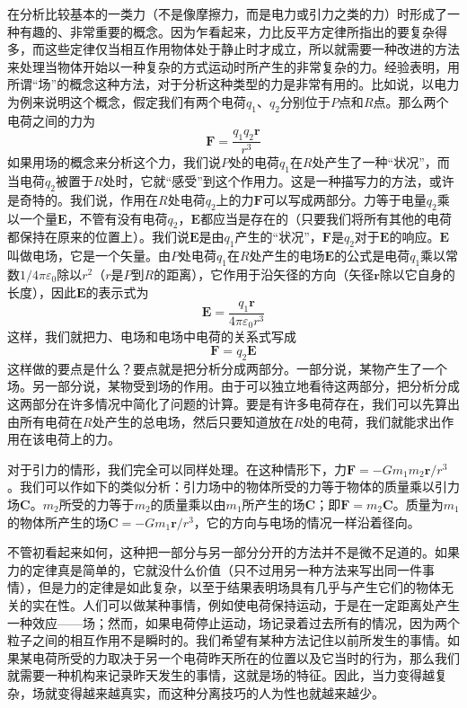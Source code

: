 在分析比较基本的一类力（不是像摩擦力，而是电力或引力之类的力）时形成了一种有趣的、非常重要的概念。因为乍看起来，力比反平方定律所指出的要复杂得多，而这些定律仅当相互作用物体处于静止时才成立，所以就需要一种改进的方法来处理当物体开始以一种复杂的方式运动时所产生的非常复杂的力。经验表明，用所谓“场”的概念这种方法，对于分析这种类型的力是非常有用的。比如说，以电力为例来说明这个概念，假定我们有两个电荷$q_1$、$q_2$分别位于$P$点和$R$点。那么两个电荷之间的力为
\begin{equation}
    \label{Eq:I:12:3}
    \boldsymbol{F}=\frac{q_1q_2 \boldsymbol{r}}{r^3}
\end{equation}
如果用场的概念来分析这个力，我们说$P$处的电荷$q_1$在$R$处产生了一种“状况”，而当电荷$q_2$被置于$R$处时，它就“感受”到这个作用力。这是一种描写力的方法，或许是奇特的。我们说，作用在$R$处电荷$q_2$上的力$\boldsymbol{F}$可以写成两部分。力等于电量$q_2$乘以一个量$\boldsymbol{E}$，不管有没有电荷$q_2$，$\boldsymbol{E}$都应当是存在的（只要我们将所有其他的电荷都保持在原来的位置上）。我们说$\boldsymbol{E}$是由$q_1$产生的“状况”，$\boldsymbol{F}$是$q_2$对于$\boldsymbol{E}$的响应。$\boldsymbol{E}$叫做电场，它是一个矢量。由$P$处电荷$q_1$在$R$处产生的电场$\boldsymbol{E}$的公式是电荷$q_1$乘以常数$1/4 \pi \varepsilon_0$除以$r^2$（$r$是$P$到$R$的距离），它作用于沿矢径的方向（矢径$\boldsymbol{r}$除以它自身的长度），因此$\boldsymbol{E}$的表示式为
\begin{equation}
    \label{Eq:I:12:4}
    \boldsymbol{E}=\frac{q_1 \boldsymbol{r}}{4 \pi \varepsilon_0 r^3}
\end{equation}
这样，我们就把力、电场和电场中电荷的关系式写成
\begin{equation}
    \label{Eq:I:12:5}
    \boldsymbol{F}=q_2 \boldsymbol{E}
\end{equation}
这样做的要点是什么？要点就是把分析分成两部分。一部分说，某物产生了一个场。另一部分说，某物受到场的作用。由于可以独立地看待这两部分，把分析分成这两部分在许多情况中简化了问题的计算。要是有许多电荷存在，我们可以先算出由所有电荷在$R$处产生的总电场，然后只要知道放在$R$处的电荷，我们就能求出作用在该电荷上的力。

对于引力的情形，我们完全可以同样处理。在这种情形下，力$\boldsymbol{F}=-Gm_1m_2\boldsymbol{r}/r^3$。我们可以作如下的类似分析：引力场中的物体所受的力等于物体的质量乘以引力场$\boldsymbol{C}$。$m_2$所受的力等于$m_2$的质量乘以由$m_1$所产生的场$\boldsymbol{C}$；即$\boldsymbol{F}=m_2\boldsymbol{C}$。质量为$m_1$的物体所产生的场$\boldsymbol{C}=-Gm_1 \boldsymbol{r}/r^3$，它的方向与电场的情况一样沿着径向。

不管初看起来如何，这种把一部分与另一部分分开的方法并不是微不足道的。如果力的定律真是简单的，它就没什么价值（只不过用另一种方法来写出同一件事情），但是力的定律是如此复杂，以至于结果表明场具有几乎与产生它们的物体无关的实在性。人们可以做某种事情，例如使电荷保持运动，于是在一定距离处产生一种效应——场；然而，如果电荷停止运动，场记录着过去所有的情况，因为两个粒子之间的相互作用不是瞬时的。我们希望有某种方法记住以前所发生的事情。如果某电荷所受的力取决于另一个电荷昨天所在的位置以及它当时的行为，那么我们就需要一种机构来记录昨天发生的事情，这就是场的特征。因此，当力变得越复杂，场就变得越来越真实，而这种分离技巧的人为性也就越来越少。

